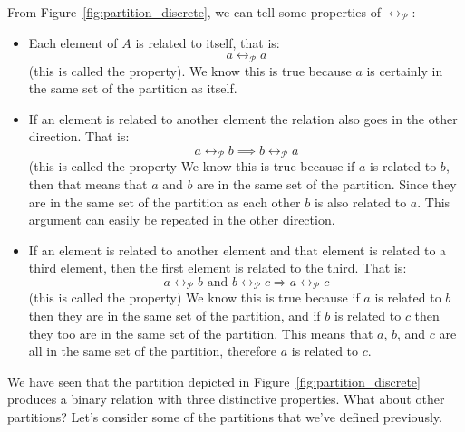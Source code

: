 From Figure~\ref{fig:partition_discrete}, we can tell some properties of $\rel_\mathcal{P}$:
\begin{itemize}
\item Each element of $A$ is related to itself, that is:
$$a \rel_\mathcal{P} a$$
(this is called the   property). 
We know this is true because $a$ is certainly in the same set of the partition as itself.
\item If an element is related to another element the relation also goes in the other direction. That is: 
$$a \rel_\mathcal{P} b \implies b \rel_\mathcal{P} a$$
(this is called the  property
We know this is true because if $a$ is related to $b$, then that means that $a$ and $b$ are in the same set of the partition. Since they are in the same set of the partition as each other $b$ is also related to $a$. This argument can easily be repeated in the other direction.
\item If an element is related to another element and that element is related to a third element, then the first element is related to the third. That is: 
$$a \rel_\mathcal{P} b \text{ and } b \rel_\mathcal{P} c \Rightarrow a \rel_\mathcal{P} c$$
(this is called the  property)
We know this is true because if $a$ is related to $b$ then they are in the same set of the partition, and if $b$ is related to $c$ then they too are in the same set of the partition. This means that $a$, $b$, and $c$ are all in the same set of the partition, therefore $a$ is related to $c$.
\end{itemize}

We have seen that the partition depicted in Figure~\ref{fig:partition_discrete} produces a binary relation with three distinctive properties. What about other partitions? Let's consider some of the partitions that we've defined previously.

